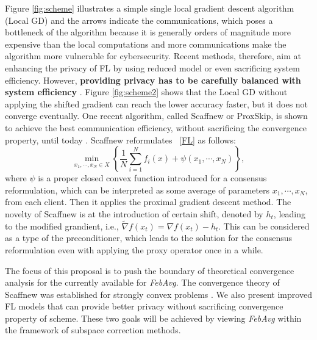 Figure \ref{fig:scheme} illustrates a simple single local gradient descent algorithm (Local GD) and the arrows indicate the communications, which poses a bottleneck of the algorithm because it is generally orders of magnitude more expensive than the local computations and more communications make the algorithm more vulnerable for cybersecurity. Recent methods, therefore, aim at enhancing the privacy of FL by using reduced model or even sacrificing system efficiency. However, {\textbf{providing privacy has to be carefully balanced with system efficiency}} \cite{li2020federated}. Figure \ref{fig:scheme2} shows that the Local GD without applying the shifted gradient can reach the lower accuracy faster, but it does not converge eventually. One recent algorithm, called Scaffnew or ProxSkip, is shown to achieve the best communication efficiency, without sacrificing the convergence property, until today \cite{mishchenko2022proxskip}. Scaffnew reformulates ~\cref{FL} as follows:
\begin{equation}\label{cp}
\min_{x_1, \cdots, x_N \in X} \left \{ \frac{1}{N} \sum_{i=1}^N f_i(x) + \psi(x_1,\cdots,x_N) \right \},
\end{equation} 
where $\psi$ is a proper closed convex function introduced for a consensus reformulation, which can be interpreted as some average of parameters $x_1,\cdots,x_N$, from each client. Then it applies the proximal gradient descent method. The novelty of Scaffnew is at the introduction of certain shift, denoted by $h_t$, leading to the modified grandient, i.e., $\widetilde{\nabla}f(x_t) = \nabla f(x_t) - h_t$. This can be considered as a type of the preconditioner, which leads to the solution for the consensus reformulation even with applying the proxy operator once in a while. 


The focus of this proposal is to push the boundary of theoretical convergence analysis for the currently available for {\textit{FebAvg}}. The convergence theory of Scaffnew was established for strongly convex problems \cite{mishchenko2022proxskip}. We also present improved FL models that can provide better privacy without sacrificing convergence property of scheme. These two goals will be achieved by viewing \textit{FebAvg} within the framework of subspace correction methods.  

